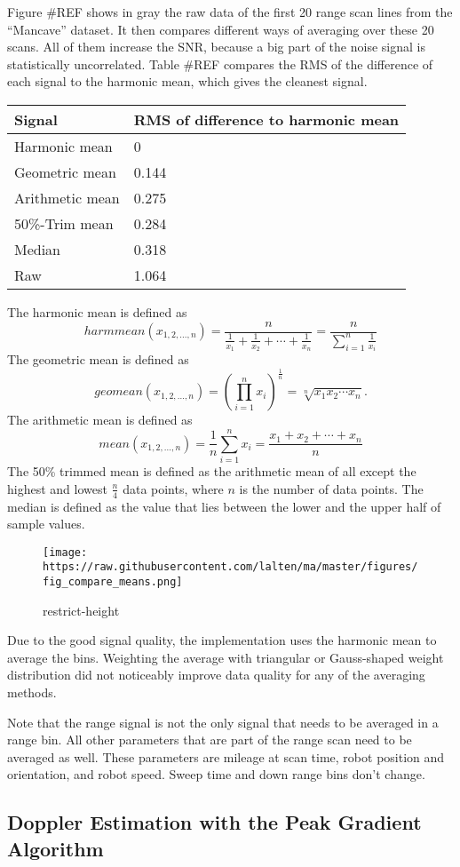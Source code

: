 Figure \#REF shows in gray the raw data of the first 20 range scan lines
from the ``Mancave'' dataset. It then compares different ways of
averaging over these 20 scans. All of them increase the SNR, because a
big part of the noise signal is statistically uncorrelated. Table \#REF
compares the RMS of the difference of each signal to the harmonic mean,
which gives the cleanest signal.

\begin{longtable}[]{@{}ll@{}}
\toprule
Signal & RMS of difference to harmonic mean\tabularnewline
\midrule
\endhead
Harmonic mean & 0\tabularnewline
Geometric mean & 0.144\tabularnewline
Arithmetic mean & 0.275\tabularnewline
50\%-Trim mean & 0.284\tabularnewline
Median & 0.318\tabularnewline
Raw & 1.064\tabularnewline
\bottomrule
\end{longtable}

The harmonic mean is defined as
\[harmmean(x_{1,2,...,n}) = \frac{n}{\frac1{x_1} + \frac1{x_2} + \cdots + \frac1{x_n}} = \frac{n}{\sum\limits_{i=1}^n \frac1{x_i}}\]
The geometric mean is defined as
\[geomean(x_{1,2,...,n}) = \left(\prod_{i=1}^n x_i \right)^\frac{1}{n} = \sqrt[n]{x_1 x_2 \cdots x_n}.\]
The arithmetic mean is defined as
\[mean(x_{1,2,...,n}) = \frac{1}{n}\sum_{i=1}^n x_i=\frac{x_1+x_2+\cdots+x_n}{n}\]
The 50\% trimmed mean is defined as the arithmetic mean of all except
the highest and lowest \(\frac{n}4\) data points, where \(n\) is the
number of data points. The median is defined as the value that lies
between the lower and the upper half of sample values.

\begin{figure}
\centering
\texttt{[image: https://raw.githubusercontent.com/lalten/ma/master/figures/fig\_compare\_means.png]}
\caption{restrict-height}
\end{figure}

Due to the good signal quality, the implementation uses the harmonic
mean to average the bins. Weighting the average with triangular or
Gauss-shaped weight distribution did not noticeably improve data quality
for any of the averaging methods.

Note that the range signal is not the only signal that needs to be
averaged in a range bin. All other parameters that are part of the range
scan need to be averaged as well. These parameters are mileage at scan
time, robot position and orientation, and robot speed. Sweep time and
down range bins don't change.

\subsection{Doppler Estimation with the Peak Gradient
Algorithm}\label{doppler-estimation-with-the-peak-gradient-algorithm}

